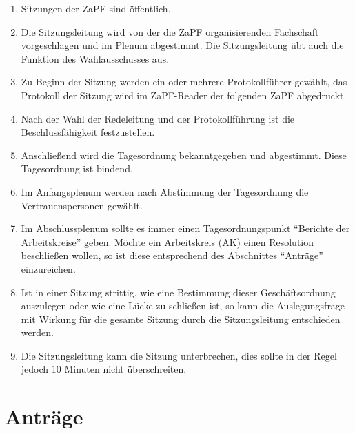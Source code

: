 \documentclass[draft,12pt,oneside]{scrreprt}
\begin{document}
\begin{enumerate}
  \item Sitzungen der ZaPF sind öffentlich.

  \item Die Sitzungsleitung wird von der die ZaPF organisierenden Fachschaft
        vorgeschlagen und im Plenum abgestimmt.
        Die Sitzungsleitung übt auch die Funktion des Wahlausschusses aus.

  \item Zu Beginn der Sitzung werden ein oder mehrere Protokollführer gewählt,
        das Protokoll der Sitzung wird im ZaPF-Reader der folgenden ZaPF
        abgedruckt.

  \item Nach der Wahl der Redeleitung und der Protokollführung ist die
        Beschlussfähigkeit festzustellen.

  \item Anschließend wird die Tagesordnung bekanntgegeben und abgestimmt.
        Diese Tagesordnung ist bindend.

  \item Im Anfangsplenum werden nach Abstimmung der Tagesordnung die
        Vertrauenspersonen gewählt.

  \item Im Abschlussplenum sollte es immer einen Tagesordnungspunkt ``Berichte
        der Arbeitskreise'' geben.
        Möchte ein Arbeitskreis (AK) einen Resolution beschließen wollen, so
        ist diese entsprechend des Abschnittes ``Anträge'' einzureichen.

  \item Ist in einer Sitzung strittig, wie eine Bestimmung dieser Geschäftsordnung
        auszulegen oder wie eine Lücke zu schließen ist, so kann die Auslegungsfrage
        mit Wirkung für die gesamte Sitzung durch die Sitzungsleitung entschieden
        werden.

  \item Die Sitzungsleitung kann die Sitzung unterbrechen, dies sollte in der
        Regel jedoch 10 Minuten nicht überschreiten.
\end{enumerate}

\section{Anträge}
\end{document}
